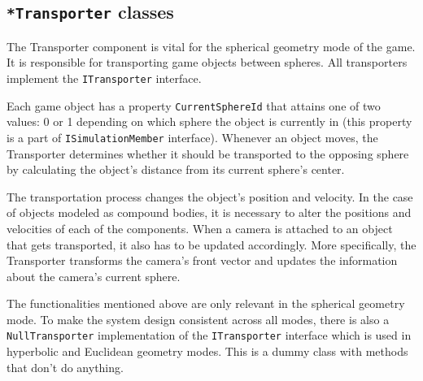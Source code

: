 \subsection{\texttt{*Transporter} classes}
The Transporter component is vital for the spherical geometry mode of the game.
It is responsible for transporting game objects between spheres.
All transporters implement the \texttt{ITransporter} interface.

Each game object has a property \texttt{CurrentSphereId} that attains one of two values: 0 or 1 depending on which sphere the object is currently in (this property is a part of \texttt{ISimulationMember} interface).
Whenever an object moves, the Transporter determines whether it should be transported to the opposing sphere by calculating the object's distance from its current sphere's center.

The transportation process changes the object's position and velocity.
In the case of objects modeled as compound bodies, it is necessary to alter the positions and velocities of each of the components.
When a camera is attached to an object that gets transported, it also has to be updated accordingly.
More specifically, the Transporter transforms the camera's front vector and updates the information about the camera's current sphere.

The functionalities mentioned above are only relevant in the spherical geometry mode.
To make the system design consistent across all modes, there is also a \texttt{NullTransporter} implementation of the \texttt{ITransporter} interface which is used in hyperbolic and Euclidean geometry modes.
This is a dummy class with methods that don't do anything.